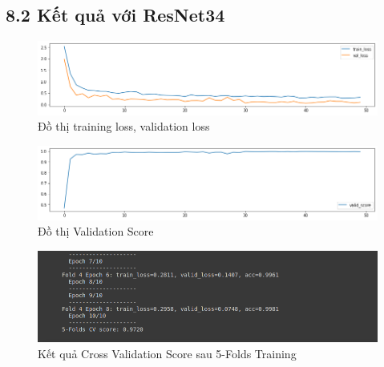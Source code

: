 \documentclass{article}
\begin{document}
	\subsection{8.2 Kết quả với ResNet34}
	\begin{figure}[H]
		\centering
		\includegraphics[width=1\linewidth]{results/resnet34/training_loss_results.png}
		\caption{Đồ thị training loss, validation loss}
		\label{fig:writing-thesis}
	\end{figure}
	\begin{figure}[H]
		\centering
		\includegraphics[width=1\linewidth]{results/resnet34/valid_score_results.png}
		\caption{Đồ thị Validation Score}
		\label{fig:writing-thesis}
	\end{figure}
	\begin{figure}[H]
		\centering
		\includegraphics[width=1\linewidth]{results/resnet34/CV_Score_5_Folds_ResNet34.png}
		\caption{Kết quả Cross Validation Score sau 5-Folds Training}
		\label{fig:writing-thesis}
	\end{figure}
\end{document}
